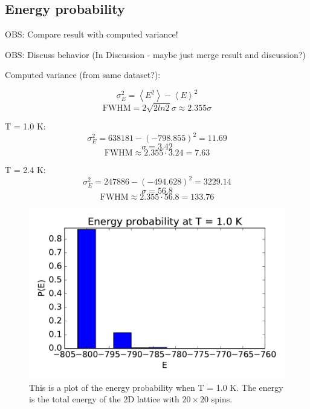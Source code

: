 
\subsection{Energy probability}

OBS: Compare result with computed variance!

OBS: Discuss behavior (In Discussion - maybe just merge result and discussion?)

Computed variance (from same dataset?):

$$ \sigma_E^2 = \left< E^2\right> - \left< E\right>^2 $$
$$\text{FWHM} = 2 \sqrt{2ln2} \sigma \approx 2.355 \sigma$$ 

T = 1.0 K:
$$ \sigma_E^2 = 638181 - (-798.855)^2 = 11.69 $$
$$ \sigma = 3.42 $$
$$ \text{FWHM} \approx 2.355 \cdot 3.24 = 7.63 $$

T = 2.4 K:
$$ \sigma_E^2 =   247886 - (-494.628)^2 = 3229.14 $$
$$ \sigma = 56.8  $$
$$ \text{FWHM} \approx 2.355 \cdot 56.8 = 133.76 $$

\begin{figure}[H]
\includegraphics[width=\linewidth]{../results/4d/d_T_1probability}\caption{This is a plot of the energy probability when T = 1.0 K. The energy is the total energy of the 2D lattice with $20\times 20$ spins.}\label{fig:probability_T_1.0}
\end{figure}

